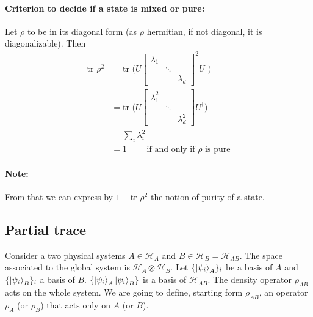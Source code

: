 \documentclass{article}
\begin{document}
\paragraph{Criterion to decide if a state is mixed or pure: }
Let $\rho$ to be in its diagonal form (as $\rho$ hermitian, if not diagonal, it
is diagonalizable). Then
\begin{equation}
    \begin{aligned}
        \text{tr } \rho^2
            & = \text{tr } \Big( U \begin{bmatrix}
                \lambda_1 & & \\ & \ddots & \\ & & \lambda_d
            \end{bmatrix}^2 U^\dagger \Big) \\
            &  = \text{tr } \Big( U \begin{bmatrix}
                \lambda_1^2 & & \\ & \ddots & \\ & & \lambda_d^2
            \end{bmatrix} U^\dagger \Big) \\
            & = \sum_i \lambda_i^2 \\
            & = 1 \qquad \text{ if and only if $\rho$ is pure}
    \end{aligned}
\end{equation}

\paragraph{Note: }From that we can express by $1-\text{tr }\rho^2$ the notion of
purity of a state.

\subsection{Partial trace}
Consider a two physical systems $A \in \mathscr{H}_A$ and $B \in \mathscr{H}_B =
\mathscr{H}_{AB}$. The space associated to the global system is
$\mathscr{H}_A\otimes\mathscr{H}_B$. Let $\{\ket{\psi_i}_A\}_i$ be a basis of
$A$ and $\{\ket{\psi_i}_B\}_i$ a basis of $B$.
$\{\ket{\psi_i}_A\ket{\psi_i}_B\}$ is a basis of $\mathscr{H}_{AB}$. The density
operator $\rho_{AB}$ acts on the whole system. We are going to define, starting
form $\rho_{AB}$, an operator $\rho_A$ (or $\rho_B$) that acts only on $A$ (or
$B$).
\end{document}
